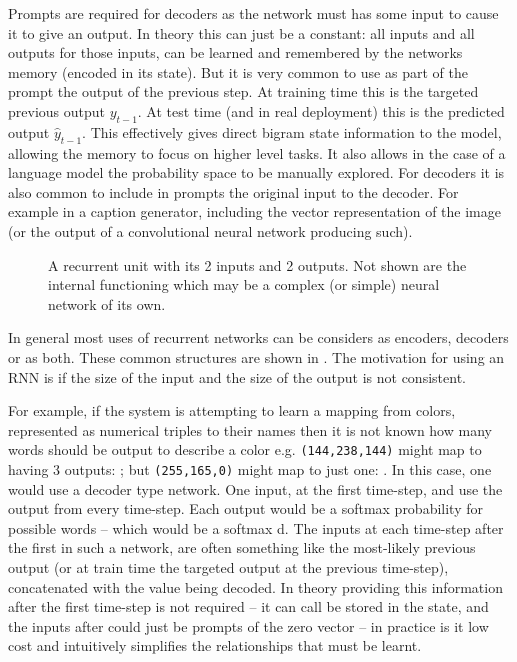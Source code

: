\documentclass[12pt,parskip]{komatufte}
\begin{document}

Prompts are required for decoders as the network must has some input to cause it to give an output.
In theory this can just be a constant: all inputs and all outputs for those inputs, can be learned and remembered by the networks memory (encoded in its state).
But it is very common to use as part of the prompt the output of the previous step.
At training time this is the targeted previous output $y_{t-1}$.
At test time (and in real deployment) this is the predicted output $\hat{y}_{t-1}$.
This effectively gives direct bigram state information to the model,
allowing the memory to focus on higher level tasks.
It also allows in the case of a language model the probability space to be manually explored.
For decoders it is also common to include in prompts the original input to the decoder.
For example in a caption generator, including the vector representation of the image (or the output of a convolutional neural network producing such).




\begin{figure}
	\caption{A recurrent unit with its 2 inputs and 2 outputs. Not shown are the internal functioning which may be a complex (or simple) neural network of its own.}	
	
	\label{fig-ru}
	
	
\end{figure}

In general most uses of recurrent networks can be considers as encoders, decoders or as both.
These common structures are shown in .
The motivation for using an RNN is if the size of the input and the size of the output is not consistent.

For example, if the system is attempting to learn a mapping from colors, represented as numerical triples to their names then it is not known how many words should be output to describe a color e.g. \texttt{(144,238,144)} might map to having 3 outputs: ; but \texttt{(255,165,0)} might map to just one:  .
In this case, one would use a decoder type network.
One input, at the first time-step, and use the output from every time-step.
Each output would be a softmax probability for possible words -- which would be a softmax d.
The inputs at each time-step after the first in such a network, are often something like the most-likely previous output (or at train time the targeted output at the previous time-step), concatenated with the value being decoded.
In theory providing this information after the first time-step is not required -- it can call be stored in the state, and the inputs after could just be prompts of the zero vector -- in practice is it low cost and intuitively simplifies the relationships that must be learnt.
\end{document}
